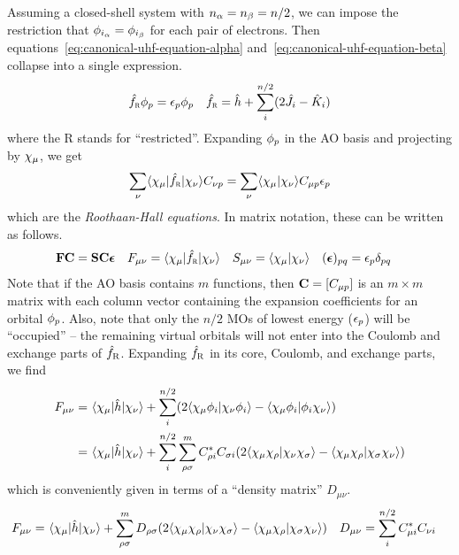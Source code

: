 \documentclass[11pt]{article}
\numberwithin{equation}{section}
\begin{document}
Assuming a closed-shell system with $n_{\alpha }=n_{\beta }=n/2$, we can impose the restriction that $\phi _{i_{\alpha }}=\phi _{i_{\beta }}$ for each pair of electrons.
Then equations~\ref{eq:canonical-uhf-equation-alpha} and~\ref{eq:canonical-uhf-equation-beta} collapse into a single expression.
\begin{align*}
  \hat{f}_\textsc{r}\phi _p
=
  \epsilon _p\phi _p
&&
  \hat{f}_\textsc{r}
=
  \hat{h}
+
  \sum_i^{n/2}
  (2\hat{J}_i - \hat{K}_i)
\end{align*}
where the R stands for ``restricted''.
Expanding $\phi _p$ in the AO basis and projecting by $\x_\mu$, we get
\begin{align*}
  \sum_\nu
  \ip{\x_\mu|\op{f}_\textsc{r}|\x_\nu}
  C_{\nu p}
=
  \sum_\nu
  \ip{\x_\mu|\x_\nu}C_{\mu p}\ev_p
\end{align*}
which are the \textit{Roothaan-Hall equations}.
In matrix notation, these can be written as follows.
\begin{align}\label{eq:roothaan-hall}
&
  \bo{F}\bo{C}
=
  \bo{S}\bo{C}\bm{\ev}
&&
  F_{\mu\nu}
=
  \ip{\x_\mu|\op{f}_\textsc{r}|\x_\nu}
&&
  S_{\mu\nu}
=
  \ip{\x_\mu|\x_\nu}
&&
  (\bm{\ev})_{pq}
=
  \ev_p\d_{pq}
\end{align}
Note that if the AO basis contains $m$ functions, then $\bo{C}=[C_{\mu p}]$ is an $m\times m$ matrix with each column vector containing the expansion coefficients for an orbital $\phi _p$.
Also, note that only the $n/2$ MOs of lowest energy ($\epsilon _p$) will be ``occupied'' -- the remaining virtual orbitals will not enter into the Coulomb and exchange parts of $\hat{f}_\textsc{R}$.
Expanding $\hat{f}_\textsc{R}$ in its core, Coulomb, and exchange parts, we find
\begin{align*}
  F_{\mu\nu}
=&\
  \ip{\x_\mu|\op{h}|\x_\nu}
+
  \sum_i^{n/2}
  (2\ip{\x_\mu\f_i|\x_\nu\f_i}-\ip{\x_\mu\f_i|\f_i\x_\nu})
\\
=&\
  \ip{\x_\mu|\op{h}|\x_\nu}
+
  \sum_i^{n/2}
  \sum_{\rho\si}^m
  C_{\rho i}^*C_{\si i}
  (2\ip{\x_\mu\x_\rho|\x_\nu\x_\si}-\ip{\x_\mu\x_\rho|\x_\si\x_\nu})
\end{align*}
which is conveniently given in terms of a ``density matrix'' $D_{\mu\nu}$.
\begin{align}\label{eq:rhf-ao-basis-fock}
  F_{\mu\nu}
=&\
  \ip{\x_\mu|\op{h}|\x_\nu}
+
  \sum_{\rho\si}^m
  D_{\rho\si}
  (2\ip{\x_\mu\x_\rho|\x_\nu\x_\si}-\ip{\x_\mu\x_\rho|\x_\si\x_\nu})
&&
  D_{\mu\nu}
=
  \sum_i^{n/2}
  C_{\mu i}^*C_{\nu i}
\end{align}
\end{document}
